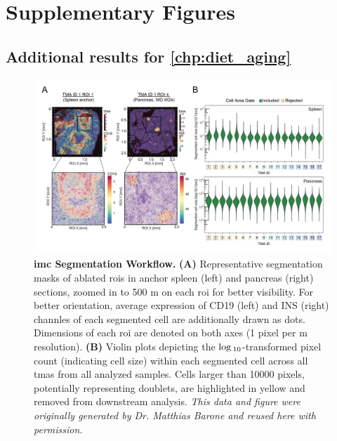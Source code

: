 
\chapter{Supplementary Figures}
\label{chp:app_figures}

\clearpage





\section[\autoref{chp:diet_aging}]{Additional results for \autoref{chp:diet_aging}}

\begin{figure}[H]
    \centering
    \vspace{-30pt}
    \includegraphics[width=\linewidth]{Appendix2/Fig/F2-A4-01.png}
    \caption[ Segmentation Workflow]{\textbf{\gls{imc} Segmentation Workflow.} \textbf{(A)} Representative segmentation masks of ablated \glspl{roi} in anchor spleen (left) and pancreas (right) sections, zoomed in to 500 \textmu m on each \gls{roi} for better visibility. For better orientation, average expression of CD19 (left) and INS (right) channles of each segmented cell are additionally drawn as dots. Dimensions of each \gls{roi} are denoted on both axes (1 pixel per \textmu m resolution). \textbf{(B)} Violin plots depicting the $\log\textsubscript{10}$-transformed pixel count (indicating cell size) within each segmented cell across all \glspl{tma} from all analyzed samples. Cells larger than 10000 pixels, potentially representing doublets, are highlighted in yellow and removed from downstream analysis. \textit{This data and figure were originally generated by Dr. Matthias Barone and reused here with permission.}}
    \label{fig:app_imc_segmentation}
\end{figure}

